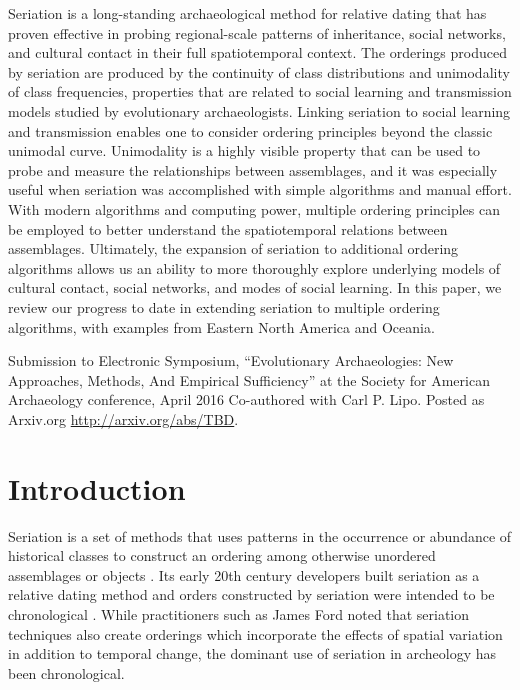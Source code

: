 \begin{description}[leftmargin=-1\labelwidth]
\item[\textsc{Abstract}] Seriation is a long-standing archaeological method for relative dating that has proven effective in probing regional-scale patterns of inheritance, social networks, and cultural contact in their full spatiotemporal context. The orderings produced by seriation are produced by the continuity of class distributions and unimodality of class frequencies, properties that are related to social learning and transmission models studied by evolutionary archaeologists. Linking seriation to social learning and transmission enables one to consider ordering principles beyond the classic unimodal curve. Unimodality is a highly visible property that can be used to probe and measure the relationships between assemblages, and it was especially useful when seriation was accomplished with simple algorithms and manual effort. With modern algorithms and computing power, multiple ordering principles can be employed to better understand the spatiotemporal relations between assemblages. Ultimately, the expansion of seriation to additional ordering algorithms allows us an ability to more thoroughly explore underlying models of cultural contact, social networks, and modes of social learning. In this paper, we review our progress to date in extending seriation to multiple ordering algorithms, with examples from Eastern North America and Oceania.

\item[\textsc{Source}]  Submission to Electronic Symposium, ``Evolutionary Archaeologies: New Approaches, Methods, And Empirical
Sufficiency'' at the Society for American Archaeology conference, April 2016  Co-authored with Carl P. Lipo.  Posted as Arxiv.org \url{http://arxiv.org/abs/TBD}.
\end{description}


\section{Introduction}\label{introduction}

Seriation is a set of methods that uses patterns in the occurrence or
abundance of historical classes to construct an ordering among otherwise
unordered assemblages or objects \citep{Dunnell:1970aa}. Its early 20th
century developers built seriation as a relative dating method and
orders constructed by seriation were intended to be chronological
\citep{o2000applying, o1998james, Lyman:2006aa, OBrien1999b, lyman1997rise}.
While practitioners such as James Ford
\citep{Ford:1938aa, Phillips1951, Ford:1935aa} noted that seriation
techniques also create orderings which incorporate the effects of
spatial variation in addition to temporal change, the dominant use of
seriation in archeology has been chronological.

